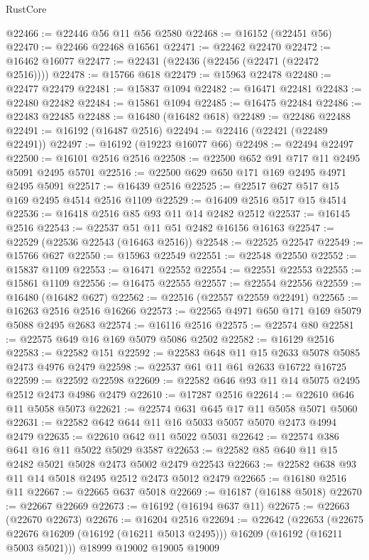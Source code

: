 \begin{lexlean}{RustCore}
\begin{coremodule}
@22466 := @22446 @56 @11 @56 @2580
@22468 := @16152 (@22451 @56)
@22470 := @22466 @22468 @16561
@22471 := @22462 @22470
@22472 := @16462 @16077
@22477 := @22431 (@22436 (@22456 (@22471 (@22472 @2516))))
@22478 := @15766 @618
@22479 := @15963 @22478
@22480 := @22477 @22479
@22481 := @15837 @1094
@22482 := @16471 @22481
@22483 := @22480 @22482
@22484 := @15861 @1094
@22485 := @16475 @22484
@22486 := @22483 @22485
@22488 := @16480 (@16482 @618)
@22489 := @22486 @22488
@22491 := @16192 (@16487 @2516)
@22494 := @22416 (@22421 (@22489 @22491))
@22497 := @16192 (@19223 @16077 @66)
@22498 := @22494 @22497
@22500 := @16101 @2516 @2516
@22508 := @22500 @652 @91 @717 @11 @2495 @5091 @2495 @5701
@22516 := @22500 @629 @650 @171 @169 @2495 @4971 @2495 @5091
@22517 := @16439 @2516
@22525 := @22517 @627 @517 @15 @169 @2495 @4514 @2516 @1109
@22529 := @16409 @2516 @517 @15 @4514
@22536 := @16418 @2516 @85 @93 @11 @14 @2482 @2512
@22537 := @16145 @2516
@22543 := @22537 @51 @11 @51 @2482 @16156 @16163
@22547 := @22529 (@22536 @22543 (@16463 @2516))
@22548 := @22525 @22547
@22549 := @15766 @627
@22550 := @15963 @22549
@22551 := @22548 @22550
@22552 := @15837 @1109
@22553 := @16471 @22552
@22554 := @22551 @22553
@22555 := @15861 @1109
@22556 := @16475 @22555
@22557 := @22554 @22556
@22559 := @16480 (@16482 @627)
@22562 := @22516 (@22557 @22559 @22491)
@22565 := @16263 @2516 @2516 @16266
@22573 := @22565 @4971 @650 @171 @169 @5079 @5088 @2495 @2683
@22574 := @16116 @2516
@22575 := @22574 @80
@22581 := @22575 @649 @16 @169 @5079 @5086 @2502
@22582 := @16129 @2516
@22583 := @22582 @151
@22592 := @22583 @648 @11 @15 @2633 @5078 @5085 @2473 @4976 @2479
@22598 := @22537 @61 @11 @61 @2633 @16722 @16725
@22599 := @22592 @22598
@22609 := @22582 @646 @93 @11 @14 @5075 @2495 @2512 @2473 @4986 @2479
@22610 := @17287 @2516
@22614 := @22610 @646 @11 @5058 @5073
@22621 := @22574 @631 @645 @17 @11 @5058 @5071 @5060
@22631 := @22582 @642 @644 @11 @16 @5033 @5057 @5070 @2473 @4994 @2479
@22635 := @22610 @642 @11 @5022 @5031
@22642 := @22574 @386 @641 @16 @11 @5022 @5029 @3587
@22653 := @22582 @85 @640 @11 @15 @2482 @5021 @5028 @2473 @5002 @2479 @22543
@22663 := @22582 @638 @93 @11 @14 @5018 @2495 @2512 @2473 @5012 @2479
@22665 := @16180 @2516 @11
@22667 := @22665 @637 @5018
@22669 := @16187 (@16188 @5018)
@22670 := @22667 @22669
@22673 := @16192 (@16194 @637 @11)
@22675 := @22663 (@22670 @22673)
@22676 := @16204 @2516
@22694 := @22642
    (@22653
      (@22675 @22676 @16209 (@16192 (@16211 @5013 @2495)))
      @16209
      (@16192 (@16211 @5003 @5021)))
    @18999
    @19002
    @19005
    @19009

\end{coremodule}
\end{lexlean}
